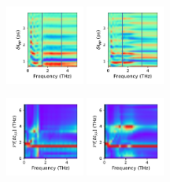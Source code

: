 \documentclass[a4paper]{article}
\begin{document}
\begin{figure}[H]
  \centering
  \includegraphics[width=0.23\textwidth]{cond_pcolor-A0-v5-imp3.pdf}
  \includegraphics[width=0.23\textwidth]{cond_pcolor-A0-v5-imp4.pdf}
\end{figure}
\begin{figure}[H]
  \centering
  \includegraphics[width=0.23\textwidth]{cond_w_pcolor-A0-v5-imp3.pdf}
  \includegraphics[width=0.23\textwidth]{cond_w_pcolor-A0-v5-imp4.pdf}
\end{figure}



\newpage
\end{document}
